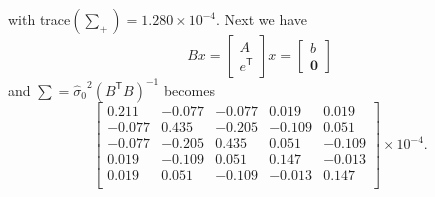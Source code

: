 with trace$(\sum_+) = 1.280 \times 10^{-4}$. Next we have
\begin{equation*}
	Bx
	=
	\begin{bmatrix}
		A\\
		e^\mathsf{T}
	\end{bmatrix}
	x
	=
	\begin{bmatrix}
		b\\
		\mathbf{0}
	\end{bmatrix}
\end{equation*}
and $\sum = {\hat{\sigma}_0}^2(B^\mathsf{T}B)^{-1}$ becomes
\begin{equation*}
	\begin{bmatrix}
		0.211 &-0.077 &-0.077 &0.019  &0.019\\
		-0.077 &0.435  &-0.205 &-0.109 &0.051\\
		-0.077 &-0.205 &0.435  &0.051  &-0.109\\
		0.019 &-0.109 &0.051  &0.147  &-0.013\\
		0.019  &0.051  &-0.109 &-0.013 &0.147\\
	\end{bmatrix}\times10^{-4}.
\end{equation*}
